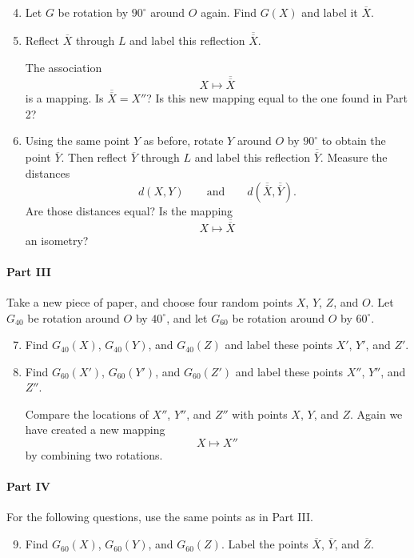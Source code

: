 \documentclass[12pt]{book} %
\begin{document}
\begin{ExerciseList}
\begin{enumerate}
\setcounter{enumi}{3}
\item Let $G$ be rotation by $90^\circ$ around $O$ again. Find $G(X)$ and label it $\overline{X}$.

\item Reflect $\overline{X}$ through $L$ and label this reflection $\overline{\overline{X}}$.

The association
\[
X\longmapsto \overline{\overline{X}}
\]
is a mapping. Is $\overline{\overline{X}}=X''$? Is this new mapping equal to the one found in Part 2?

\item Using the same point $Y$ as before, rotate $Y$ around $O$ by $90^\circ$ to obtain the point $\overline{Y}$. Then reflect $\overline{Y}$ through $L$ and label this reflection $\overline{\overline{Y}}$. Measure the distances
\[
d(X,Y)\qquad \text{and} \qquad d(\overline{\overline{X}},\overline{\overline{Y}}).
\]
Are those distances equal? Is the mapping
\[
X\longmapsto \overline{\overline{X}}
\]
an isometry?
\end{enumerate}

\paragraph{Part III}
Take a new piece of paper, and choose four random points $X$, $Y$, $Z$, and $O$. Let $G_{40}$ be rotation around $O$ by $40^\circ$, and let $G_{60}$ be rotation around $O$ by $60^\circ$.

\begin{enumerate}
\setcounter{enumi}{6}
\item Find $G_{40}(X)$, $G_{40}(Y)$, and $G_{40}(Z)$ and label these points $X'$, $Y'$, and $Z'$.

\item Find $G_{60}(X')$, $G_{60}(Y')$, and $G_{60}(Z')$ and label these points $X''$, $Y''$, and $Z''$.

Compare the locations of $X''$, $Y''$, and $Z''$ with points $X$, $Y$, and $Z$. Again we have created a new mapping
\[
X\longmapsto X''
\]
by combining two rotations.
\end{enumerate}

\paragraph{Part IV}
For the following questions, use the same points as in Part III.

\begin{enumerate}
\setcounter{enumi}{8}
\item Find $G_{60}(X)$, $G_{60}(Y)$, and $G_{60}(Z)$. Label the points $\overline{X}$, $\overline{Y}$, and $\overline{Z}$.


\end{enumerate}
\end{ExerciseList}
\end{document}
